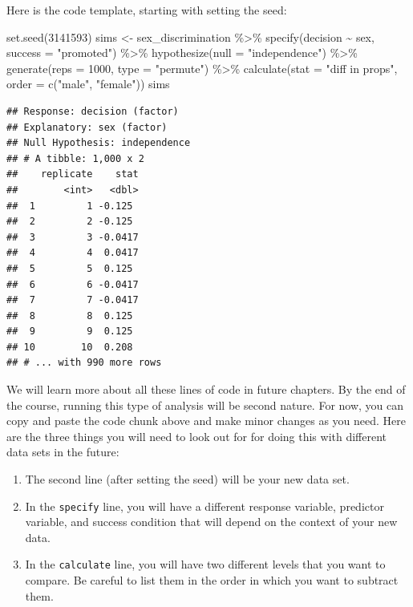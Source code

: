 \documentclass[
]{book}
\newenvironment{Shaded}{\begin{snugshade}}{\end{snugshade}}
\newcommand{\AttributeTok}[1]{\textcolor[rgb]{0.77,0.63,0.00}{#1}}
\newcommand{\DecValTok}[1]{\textcolor[rgb]{0.00,0.00,0.81}{#1}}
\newcommand{\FunctionTok}[1]{\textcolor[rgb]{0.00,0.00,0.00}{#1}}
\newcommand{\NormalTok}[1]{#1}
\newcommand{\OtherTok}[1]{\textcolor[rgb]{0.56,0.35,0.01}{#1}}
\newcommand{\SpecialCharTok}[1]{\textcolor[rgb]{0.00,0.00,0.00}{#1}}
\newcommand{\StringTok}[1]{\textcolor[rgb]{0.31,0.60,0.02}{#1}}
\providecommand{\tightlist}{%
  \setlength{\itemsep}{0pt}\setlength{\parskip}{0pt}}
\begin{document}
Here is the code template, starting with setting the seed:

\begin{Shaded}
\begin{Highlighting}[]
\FunctionTok{set.seed}\NormalTok{(}\DecValTok{3141593}\NormalTok{)}
\NormalTok{sims }\OtherTok{\textless{}{-}}\NormalTok{ sex\_discrimination }\SpecialCharTok{\%\textgreater{}\%}
    \FunctionTok{specify}\NormalTok{(decision }\SpecialCharTok{\textasciitilde{}}\NormalTok{ sex, }\AttributeTok{success =} \StringTok{"promoted"}\NormalTok{) }\SpecialCharTok{\%\textgreater{}\%}
    \FunctionTok{hypothesize}\NormalTok{(}\AttributeTok{null =} \StringTok{"independence"}\NormalTok{) }\SpecialCharTok{\%\textgreater{}\%}
    \FunctionTok{generate}\NormalTok{(}\AttributeTok{reps =} \DecValTok{1000}\NormalTok{, }\AttributeTok{type =} \StringTok{"permute"}\NormalTok{) }\SpecialCharTok{\%\textgreater{}\%}
    \FunctionTok{calculate}\NormalTok{(}\AttributeTok{stat =} \StringTok{"diff in props"}\NormalTok{, }\AttributeTok{order =} \FunctionTok{c}\NormalTok{(}\StringTok{"male"}\NormalTok{, }\StringTok{"female"}\NormalTok{))}
\NormalTok{sims}
\end{Highlighting}
\end{Shaded}

\begin{verbatim}
## Response: decision (factor)
## Explanatory: sex (factor)
## Null Hypothesis: independence
## # A tibble: 1,000 x 2
##    replicate    stat
##        <int>   <dbl>
##  1         1 -0.125 
##  2         2 -0.125 
##  3         3 -0.0417
##  4         4  0.0417
##  5         5  0.125 
##  6         6 -0.0417
##  7         7 -0.0417
##  8         8  0.125 
##  9         9  0.125 
## 10        10  0.208 
## # ... with 990 more rows
\end{verbatim}

We will learn more about all these lines of code in future chapters. By the end of the course, running this type of analysis will be second nature. For now, you can copy and paste the code chunk above and make minor changes as you need. Here are the three things you will need to look out for for doing this with different data sets in the future:

\begin{enumerate}
\def\labelenumi{\arabic{enumi}.}
\tightlist
\item
  The second line (after setting the seed) will be your new data set.
\item
  In the \texttt{specify} line, you will have a different response variable, predictor variable, and success condition that will depend on the context of your new data.
\item
  In the \texttt{calculate} line, you will have two different levels that you want to compare. Be careful to list them in the order in which you want to subtract them.
\end{enumerate}
\end{document}
